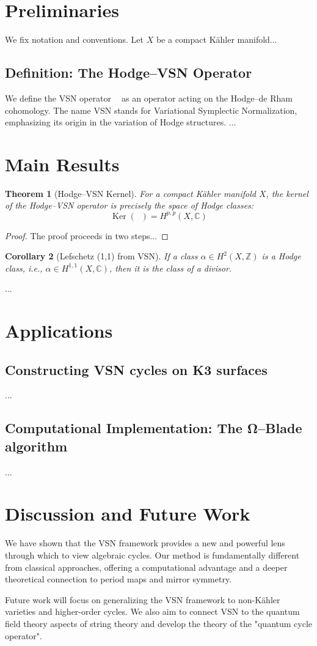 \documentclass[11pt]{article}
\newtheorem{theorem}{Theorem}[section]
\newtheorem{corollary}[theorem]{Corollary}
\theoremstyle{definition}
\theoremstyle{remark}
\DeclareMathOperator{\Ker}{Ker}
\DeclareMathOperator{\VSN}{\mathcal{D}_{\mathrm{VSN}}}
\begin{document}
\section{Preliminaries}
\label{sec:preliminaries}
We fix notation and conventions. Let $X$ be a compact Kähler manifold...
\subsection{Definition: The Hodge–VSN Operator}
\label{ssec:vsn_def}
We define the VSN operator $\VSN$ as an operator acting on the Hodge–de Rham cohomology. The name VSN stands for Variational Symplectic Normalization, emphasizing its origin in the variation of Hodge structures.
...
\section{Main Results}
\label{sec:main_results}
\begin{theorem}[Hodge–VSN Kernel]
For a compact Kähler manifold $X$, the kernel of the Hodge–VSN operator is precisely the space of Hodge classes:
$$ \Ker(\VSN) = H^{p,p}(X,\mathbb{C}) $$
\end{theorem}
\begin{proof}
The proof proceeds in two steps...
\end{proof}
\begin{corollary}[Lefschetz (1,1) from VSN]
If a class $\alpha \in H^2(X,\mathbb{Z})$ is a Hodge class, i.e., $\alpha \in H^{1,1}(X,\mathbb{C})$, then it is the class of a divisor.
\end{corollary}
...
\section{Applications}
\label{sec:applications}
\subsection{Constructing VSN cycles on K3 surfaces}
...
\subsection{Computational Implementation: The Ω–Blade algorithm}
...
\section{Discussion and Future Work}
\label{sec:discussion}
We have shown that the VSN framework provides a new and powerful lens through which to view algebraic cycles. Our method is fundamentally different from classical approaches, offering a computational advantage and a deeper theoretical connection to period maps and mirror symmetry.

Future work will focus on generalizing the VSN framework to non-Kähler varieties and higher-order cycles. We also aim to connect VSN to the quantum field theory aspects of string theory and develop the theory of the "quantum cycle operator".
\end{document}
